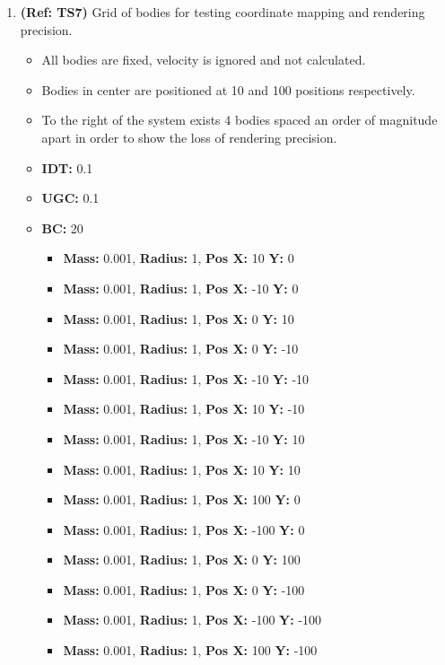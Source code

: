 \begin{enumerate}
\pagebreak
\item \textbf{(Ref: TS7)} Grid of bodies for testing coordinate mapping and rendering precision.
  \begin{itemize}
  \item All bodies are fixed, velocity is ignored and not calculated.
  \item Bodies in center are positioned at 10 and 100 positions respectively.
  \item To the right of the system exists 4 bodies spaced an order of magnitude apart in order to show the loss of rendering precision.
  \item \textbf{IDT:} 0.1
  \item \textbf{UGC:} 0.1 
  \item \textbf{BC:} 20
    \begin{itemize}
    \item \textbf{Mass:} 0.001, \textbf{Radius:} 1, \textbf{Pos X:} 10 \textbf{Y:} 0
    \item \textbf{Mass:} 0.001, \textbf{Radius:} 1, \textbf{Pos X:} -10 \textbf{Y:} 0
    \item \textbf{Mass:} 0.001, \textbf{Radius:} 1, \textbf{Pos X:} 0 \textbf{Y:} 10
    \item \textbf{Mass:} 0.001, \textbf{Radius:} 1, \textbf{Pos X:} 0 \textbf{Y:} -10
    \item \textbf{Mass:} 0.001, \textbf{Radius:} 1, \textbf{Pos X:} -10 \textbf{Y:} -10
    \item \textbf{Mass:} 0.001, \textbf{Radius:} 1, \textbf{Pos X:} 10 \textbf{Y:} -10
    \item \textbf{Mass:} 0.001, \textbf{Radius:} 1, \textbf{Pos X:} -10 \textbf{Y:} 10
    \item \textbf{Mass:} 0.001, \textbf{Radius:} 1, \textbf{Pos X:} 10 \textbf{Y:} 10
    \item \textbf{Mass:} 0.001, \textbf{Radius:} 1, \textbf{Pos X:} 100 \textbf{Y:} 0
    \item \textbf{Mass:} 0.001, \textbf{Radius:} 1, \textbf{Pos X:} -100 \textbf{Y:} 0
    \item \textbf{Mass:} 0.001, \textbf{Radius:} 1, \textbf{Pos X:} 0 \textbf{Y:} 100
    \item \textbf{Mass:} 0.001, \textbf{Radius:} 1, \textbf{Pos X:} 0 \textbf{Y:} -100
    \item \textbf{Mass:} 0.001, \textbf{Radius:} 1, \textbf{Pos X:} -100 \textbf{Y:} -100
    \item \textbf{Mass:} 0.001, \textbf{Radius:} 1, \textbf{Pos X:} 100 \textbf{Y:} -100

\end{itemize}
\end{itemize}
\end{enumerate}
